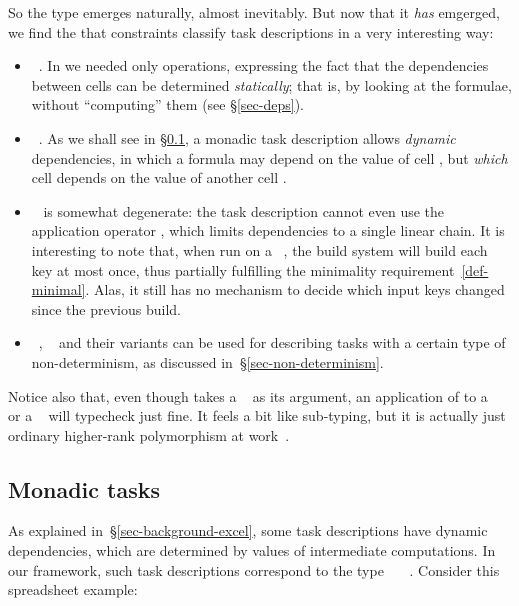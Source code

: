 So the type  emerges naturally, almost inevitably.  But now that
it \emph{has} emgerged, we find the that constraints  classify task descriptions
in a very interesting way:
\begin{itemize}
\item {}~. In  we needed only 
  operations, expressing the fact that the dependencies between cells can be
  determined \emph{statically}; that is, by looking at the formulae, without
  ``computing'' them (see \S\ref{sec-deps}).
\item {}~. As we shall see in \S\ref{sec-task-monad}, a monadic task
  description allows \emph{dynamic} dependencies, in which a formula may depend
  on the value of cell , but \emph{which} cell  depends on the
  value of another cell .
\item {}~ is somewhat degenerate: the task description cannot
  even use the application operator \hs{<*>}, which limits dependencies to a
  single linear chain. It is interesting to note that, when run on a
  ~, the  build system will build each key at most
  once, thus partially fulfilling the minimality requirement~\ref{def-minimal}.
  Alas, it still has no mechanism to decide which input keys changed since the
  previous build.
\item {}~, ~ and their
  variants can be used for describing tasks with a certain type of
  non-determinism, as discussed in~\S\ref{sec-non-determinism}.
\end{itemize}

Notice also that, even though  takes a ~ as its
argument, an application of  to a ~ or
a ~ will typecheck just fine. It feels a bit like
sub-typing, but it is actually just ordinary higher-rank polymorphism at
work~\cite{jones2007practical}.

\subsection{Monadic tasks}\label{sec-task-monad}

As explained in~\S\ref{sec-background-excel}, some task descriptions have dynamic
dependencies, which are determined by values of intermediate computations. In
our framework, such task descriptions correspond to the type
~~~. Consider this spreadsheet example:

